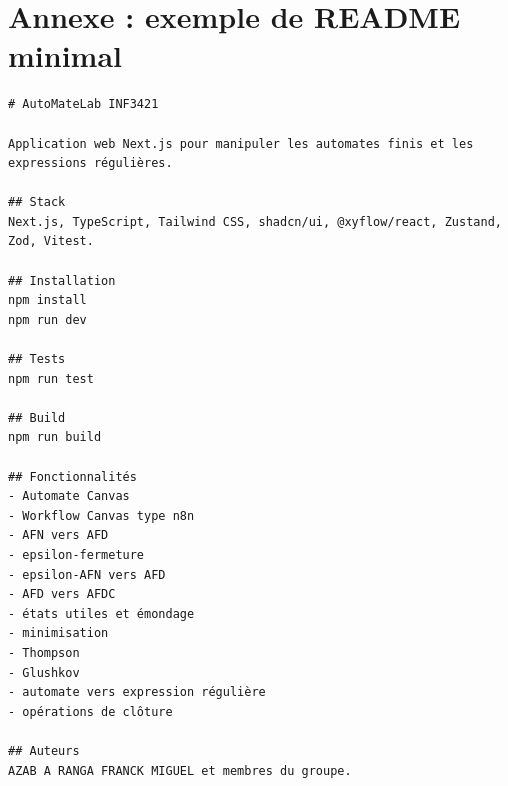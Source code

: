 \documentclass[11pt,a4paper]{report}
\begin{document}
\chapter{Annexe : exemple de README minimal}
\begin{lstlisting}
# AutoMateLab INF3421

Application web Next.js pour manipuler les automates finis et les expressions régulières.

## Stack
Next.js, TypeScript, Tailwind CSS, shadcn/ui, @xyflow/react, Zustand, Zod, Vitest.

## Installation
npm install
npm run dev

## Tests
npm run test

## Build
npm run build

## Fonctionnalités
- Automate Canvas
- Workflow Canvas type n8n
- AFN vers AFD
- epsilon-fermeture
- epsilon-AFN vers AFD
- AFD vers AFDC
- états utiles et émondage
- minimisation
- Thompson
- Glushkov
- automate vers expression régulière
- opérations de clôture

## Auteurs
AZAB A RANGA FRANCK MIGUEL et membres du groupe.
\end{lstlisting}
\end{document}

